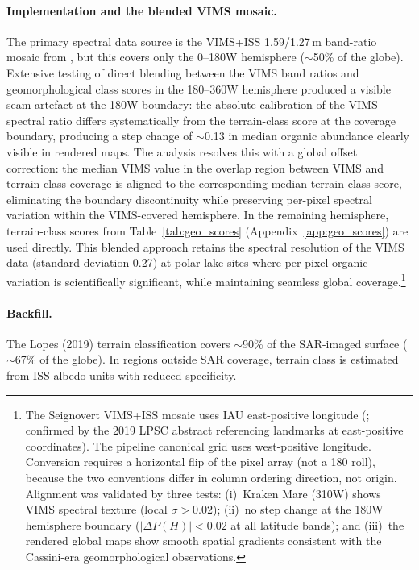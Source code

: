 \paragraph{Implementation and the blended VIMS mosaic.}
The primary spectral data source is the VIMS+ISS 1.59/1.27\,\textmu{}m
band-ratio mosaic from \citet{Seignovert2019CaltechDATA}, but this covers
only the 0--180\textdegree{}W hemisphere ($\sim$50\% of the globe).  Extensive
testing of direct blending between the VIMS band ratios and geomorphological
class scores in the 180--360\textdegree{}W hemisphere produced a visible seam
artefact at the 180\textdegree{}W boundary: the absolute calibration of the
VIMS spectral ratio differs systematically from the terrain-class score at
the coverage boundary, producing a step change of $\sim$0.13 in median organic
abundance clearly visible in rendered maps.  The analysis resolves this with a global offset correction:
the median VIMS value in the overlap region between VIMS and terrain-class
coverage is aligned to the corresponding median terrain-class score,
eliminating the boundary discontinuity while preserving per-pixel spectral
variation within the VIMS-covered hemisphere.  In the remaining hemisphere,
terrain-class scores from Table~\ref{tab:geo_scores}
(Appendix~\ref{app:geo_scores}) are used directly.  This blended approach
retains the spectral resolution of the VIMS data (standard deviation 0.27)
at polar lake sites where per-pixel organic variation is scientifically
significant, while maintaining seamless global coverage.\footnote{The
Seignovert VIMS+ISS mosaic uses IAU east-positive longitude
(\citealt{Seignovert2019CaltechDATA}; confirmed by the 2019 LPSC abstract
referencing landmarks at east-positive coordinates).  The pipeline canonical
grid uses west-positive longitude.  Conversion requires a horizontal flip
of the pixel array (not a 180\textdegree{} roll), because the two conventions
differ in column ordering direction, not origin.  Alignment was validated by
three tests: (i)~Kraken Mare (310\textdegree{}W) shows VIMS spectral texture
(local $\sigma > 0.02$); (ii)~no step change at the 180\textdegree{}W
hemisphere boundary ($|\Delta P(H)| < 0.02$ at all latitude bands); and
(iii)~the rendered global maps show smooth spatial gradients consistent
with the Cassini-era geomorphological observations.}

\paragraph{Backfill.}
The Lopes (2019) terrain classification covers $\sim$90\% of the SAR-imaged
surface ($\sim$67\% of the globe).  In regions outside SAR coverage, terrain
class is estimated from ISS albedo units with reduced specificity.


